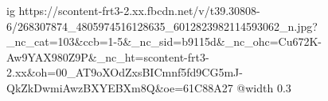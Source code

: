  
 
 
 
 

\ifcmt
  ig https://scontent-frt3-2.xx.fbcdn.net/v/t39.30808-6/268307874_4805974516128635_6012823982114593062_n.jpg?_nc_cat=103&ccb=1-5&_nc_sid=b9115d&_nc_ohc=Cu672K-Aw9YAX980Z9P&_nc_ht=scontent-frt3-2.xx&oh=00_AT9oXOdZxsBICmnf5fd9CG5mJ-QkZkDwmiAwzBXYEBXm8Q&oe=61C88A27
  @width 0.3
\fi
